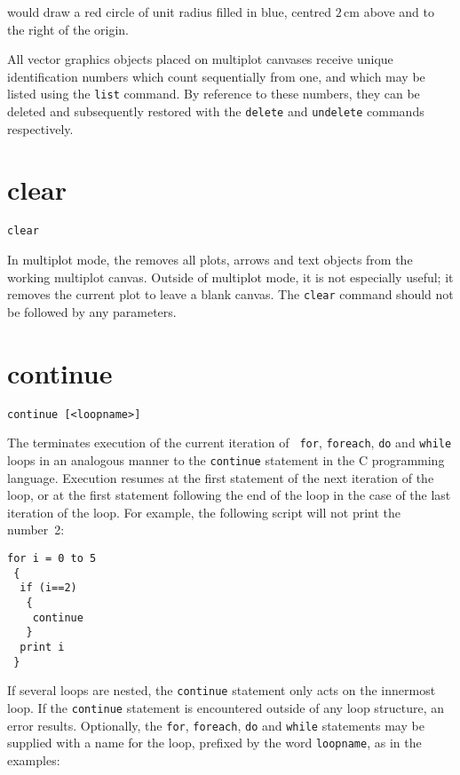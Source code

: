\noindent would draw a red circle of unit radius filled in blue, centred
$2\,\mathrm{cm}$ above and to the right of the origin.

All vector graphics objects placed on multiplot canvases receive unique
identification numbers which count sequentially from one, and which may be
listed using the {\tt list} command.  By reference to these numbers, they can
be deleted and subsequently restored with the {\tt delete} and {\tt undelete}
commands respectively.


\section{clear}

\begin{verbatim}
clear
\end{verbatim}

In multiplot mode, the  removes all plots, arrows and text
objects from the working multiplot canvas. Outside of multiplot mode, it is not
especially useful; it removes the current plot to leave a blank canvas.  The
{\tt clear} command should not be followed by any parameters.


\section{continue}

\begin{verbatim}
continue [<loopname>]
\end{verbatim}

The  terminates execution of the current iteration of {\tt
for}, {\tt foreach}, {\tt do} and {\tt while} loops in an analogous manner to
the {\tt continue} statement in the C programming language. Execution resumes
at the first statement of the next iteration of the loop, or at the first
statement following the end of the loop in the case of the last iteration of
the loop.  For example, the following script will not print the number~2:

\begin{verbatim}
for i = 0 to 5
 {
  if (i==2)
   {
    continue
   }
  print i
 }
\end{verbatim}

If several loops are nested, the {\tt continue} statement only
acts on the innermost loop. If the {\tt continue} statement is encountered outside of any
loop structure, an error results. Optionally, the {\tt for}, {\tt foreach},
{\tt do} and {\tt while} statements may be supplied with a name for the loop, prefixed by
the word {\tt loopname}, as in the examples:

